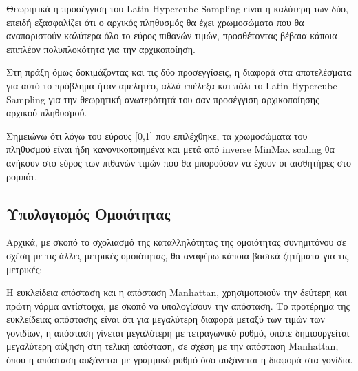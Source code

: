 \documentclass[12pt,a4paper]{article}
\begin{document}
Θεωρητικά η προσέγγιση του Latin Hypercube Sampling είναι η καλύτερη των δύο, επειδή εξασφαλίζει ότι ο αρχικός πληθυσμός θα έχει χρωμοσώματα που θα αναπαριστούν καλύτερα όλο το εύρος πιθανών τιμών, προσθέτοντας βέβαια κάποια επιπλέον πολυπλοκότητα για την αρχικοποίηση.

Στη πράξη όμως δοκιμάζοντας και τις δύο προσεγγίσεις, η διαφορά στα αποτελέσματα για αυτό το πρόβλημα ήταν αμελητέο, αλλά επέλεξα και πάλι το Latin Hypercube Sampling για την θεωρητική ανωτερότητά του σαν προσέγγιση αρχικοποίησης αρχικού πληθυσμού.

Σημειώνω ότι λόγω του εύρους [0,1] που επιλέχθηκε, τα χρωμοσώματα του πληθυσμού είναι ήδη κανονικοποιημένα και μετά από inverse MinMax scaling θα ανήκουν στο εύρος των πιθανών τιμών που θα μπορούσαν να έχουν οι αισθητήρες στο ρομπότ.

\subsection{Υπολογισμός Ομοιότητας}

Αρχικά, με σκοπό το σχολιασμό της καταλληλότητας της ομοιότητας συνημιτόνου σε σχέση με τις άλλες μετρικές ομοιότητας, θα αναφέρω κάποια βασικά ζητήματα για τις μετρικές:

Η ευκλείδεια απόσταση και η απόσταση Manhattan, χρησιμοποιούν την δεύτερη και πρώτη νόρμα αντίστοιχα, με σκοπό να υπολογίσουν την απόσταση. Το προτέρημα της ευκλείδειας απόστασης είναι ότι για μεγαλύτερη διαφορά μεταξύ των τιμών των γονιδίων, η απόσταση γίνεται μεγαλύτερη με τετραγωνικό ρυθμό, οπότε δημιουργείται μεγαλύτερη αύξηση στη τελική απόσταση, σε σχέση με την απόσταση Manhattan, όπου η απόσταση αυξάνεται με γραμμικό ρυθμό όσο αυξάνεται η διαφορά στα γονίδια.
\end{document}
